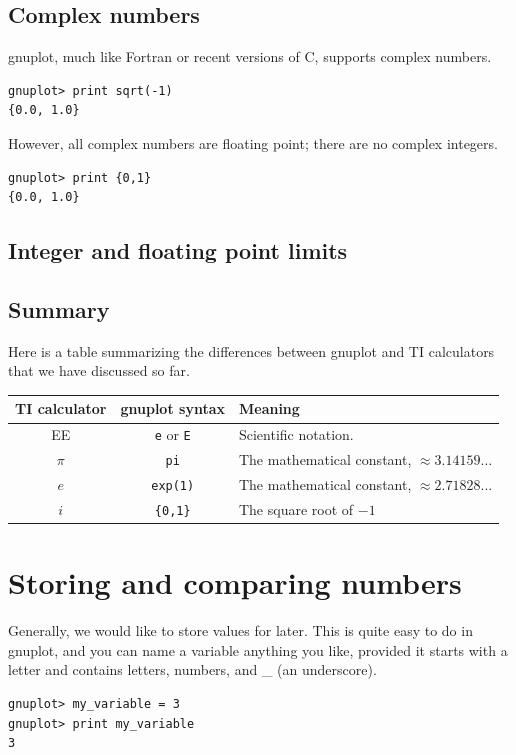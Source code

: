 \documentclass[11pt,letterpaper]{report}
\begin{document}
\section{Complex numbers}

gnuplot, much like Fortran or recent versions of C, supports complex numbers.
\begin{lstlisting}
gnuplot> print sqrt(-1)
{0.0, 1.0}
\end{lstlisting}
However, all complex numbers are floating point; there are no complex integers.
\begin{lstlisting}
gnuplot> print {0,1}
{0.0, 1.0}
\end{lstlisting}

\section{Integer and floating point limits}


\section{Summary}
Here is a table summarizing the differences between gnuplot and TI calculators that we have discussed so far.

\noindent
\begin{tabular}{|c|c|l|}
\hline 
TI calculator & gnuplot syntax & Meaning \\ 
\hline 
EE & \lstinline+e+ or \lstinline+E+ & Scientific notation. \\ 
\hline 
$\pi$ & \lstinline+pi+ & The mathematical constant, $\approx 3.14159...$ \\ 
\hline 
$e$ & \lstinline+exp(1)+ & The mathematical constant, $\approx 2.71828...$ \\ 
\hline
$i$ & \lstinline+{0,1}+ & The square root of $-1$\\ 
\hline 
\end{tabular} 

\chapter{Storing and comparing numbers}
Generally, we would like to store values for later. This is quite easy to do in gnuplot, and you can name a variable anything you like, provided it starts with a letter and contains letters, numbers, and \_ (an underscore).
\begin{lstlisting}
gnuplot> my_variable = 3
gnuplot> print my_variable
3
\end{lstlisting}
\end{document}
